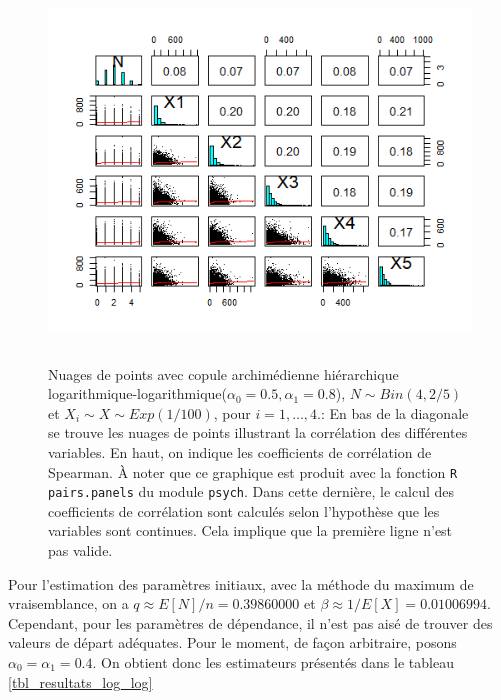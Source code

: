 \documentclass{article}
\begin{document}
		\begin{figure}[H]
			\centering
			\includegraphics[height=10cm]{Graph/scatterplot_log_log.png}
			\caption[Nuages de points du scénario \ref{scenario_log_log}]
			{Nuages de points avec copule archimédienne hiérarchique logarithmique-logarithmique($\alpha_0=0.5, \alpha_1=0.8$), $N \sim Bin(4, 2/5)$ et $X_i \sim X \sim Exp(1/100)$, pour $i=1,\dots, 4$.:
				En bas de la diagonale se trouve les nuages de points illustrant la corrélation des différentes variables. En haut, on indique les coefficients de corrélation de Spearman. À noter que ce graphique est produit avec la fonction \texttt{R} \texttt{pairs.panels} du module \texttt{psych}. Dans cette dernière, le calcul des coefficients de corrélation sont calculés selon l'hypothèse que les variables sont continues. Cela implique que la première ligne n'est pas valide.}
			\label{graph_scatterplot_log_log}
		\end{figure}
		
		Pour l'estimation des paramètres initiaux, avec la méthode du maximum de vraisemblance, on a $q \approx E[N]/n = 0.39860000$ et $\beta \approx 1/E[X] = 0.01006994$. Cependant, pour les paramètres de dépendance, il n'est pas aisé de trouver des valeurs de départ adéquates. Pour le moment, de façon arbitraire, posons $\alpha_{0}=\alpha_{1}=0.4$. On obtient donc les estimateurs présentés dans le tableau \ref{tbl_resultats_log_log}
		
\end{document}
